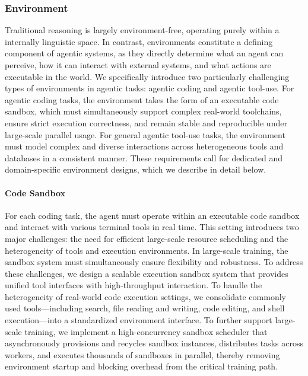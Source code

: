 \documentclass{article}
\begin{document}
\subsubsection{Environment}
\label{sec:post_training_env}

Traditional reasoning is largely environment-free, operating purely within a internally linguistic space.
In contrast, environments constitute a defining component of agentic systems, as they directly determine what an agent can perceive, how it can interact with external systems, and what actions are executable in the world.
We specifically introduce two particularly challenging types of environments in agentic tasks: agentic coding and agentic tool-use.
For agentic coding tasks, the environment takes the form of an executable code sandbox, which must simultaneously support complex real-world toolchains, ensure strict execution correctness, and remain stable and reproducible under large-scale parallel usage.
For general agentic tool-use tasks, the environment must model complex and diverse interactions across heterogeneous tools and databases in a consistent manner.
These requirements call for dedicated and domain-specific environment designs, which we describe in detail below.

\paragraph{Code Sandbox}
For each coding task, the agent must operate within an executable code sandbox and interact with various terminal tools in real time.
This setting introduces two major challenges: the need for efficient large-scale resource scheduling and the heterogeneity of tools and execution environments.
In large-scale training, the sandbox system must simultaneously ensure flexibility and robustness.
To address these challenges, we design a scalable execution sandbox system that provides unified tool interfaces with high-throughput interaction.
To handle the heterogeneity of real-world code execution settings, we consolidate commonly used tools—including search, file reading and writing, code editing, and shell execution—into a standardized environment interface.
To further support large-scale training, we implement a high-concurrency sandbox scheduler that asynchronously provisions and recycles sandbox instances, distributes tasks across workers, and executes thousands of sandboxes in parallel, thereby removing environment startup and blocking overhead from the critical training path.
\end{document}
